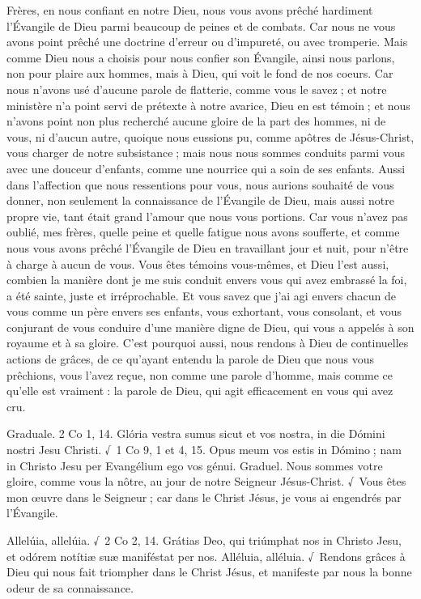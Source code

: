 \begin{paracol}{2}
Frères, en nous confiant en notre Dieu,  nous vous avons prêché hardiment l’Évangile de Dieu parmi beaucoup de peines et de combats. Car nous ne vous avons point prêché une doctrine d’erreur ou d’impureté, ou avec tromperie. Mais comme Dieu nous a choisis pour nous confier son Évangile, ainsi nous parlons, non pour plaire aux hommes, mais à Dieu, qui voit le fond de nos coeurs. Car nous n’avons usé d’aucune parole de flatterie, comme vous le savez ; et notre ministère n’a point servi de prétexte à notre avarice, Dieu en est témoin ; et nous n’avons point non plus recherché aucune gloire de la part des hommes, ni de vous, ni d’aucun autre, quoique nous eussions pu, comme apôtres de Jésus-Christ, vous charger de notre subsistance ; mais nous nous sommes conduits parmi vous avec une douceur d’enfants, comme une nourrice qui a soin de ses enfants. Aussi dans l’affection que nous ressentions pour vous, nous aurions souhaité de vous donner, non seulement la connaissance de l’Évangile de Dieu, mais aussi notre propre vie, tant était grand l’amour que nous vous portions. Car vous n’avez pas oublié, mes frères, quelle peine et quelle fatigue nous avons soufferte, et comme nous vous avons prêché l’Évangile de Dieu en travaillant jour et nuit, pour n’être à charge à aucun de vous. Vous êtes témoins vous-mêmes, et Dieu l’est aussi, combien la manière dont je me suis conduit envers vous qui avez embrassé la foi, a été sainte, juste et irréprochable. Et vous savez que j’ai agi envers chacun de vous comme un père envers ses enfants,  vous exhortant, vous consolant, et vous conjurant de vous conduire d’une manière digne de Dieu, qui vous a appelés à son royaume et à sa gloire. C’est pourquoi aussi, nous rendons à Dieu de continuelles actions de grâces, de ce qu’ayant entendu la parole de Dieu que nous vous prêchions, vous l’avez reçue, non comme une parole d’homme, mais comme ce qu’elle est vraiment : la parole de Dieu, qui agit efficacement en vous qui avez cru.
\switchcolumn*

Graduale. 2 Co 1, 14. Glória vestra sumus sicut et vos nostra, in die Dómini nostri Jesu Christi. √~1 Co 9, 1 et 4, 15. Opus meum vos estis in Dómino ; nam in Christo Jesu per Evangélium ego vos génui.
\switchcolumn
Graduel. Nous sommes votre gloire, comme vous la nôtre, au jour de notre Seigneur Jésus-Christ. √~Vous êtes mon œuvre dans le Seigneur ; car dans le Christ Jésus, je vous ai engendrés par l’Évangile.
\switchcolumn*

Allelúia, allelúia. √~2 Co 2, 14. Grátias Deo, qui triúmphat nos in Christo Jesu, et odórem notítiæ suæ maniféstat per nos.
\switchcolumn
Alléluia, alléluia. √~Rendons grâces à Dieu qui nous fait triompher dans le Christ Jésus, et manifeste par nous la bonne odeur de sa connaissance.
\switchcolumn*


\end{paracol}
